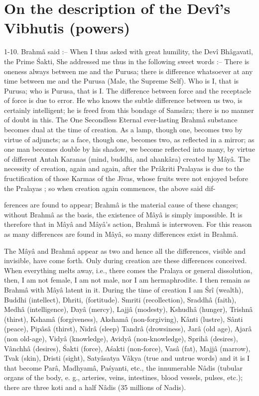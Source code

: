 ﻿\chapter{On the description of the Dev\^i's Vibhutis (powers)}

1-10. Brahm\^a said :-- When I thus asked with great humility, the Dev\^i Bh\^agavat\^i, the Prime \'Sakti, She addressed me thus in the following sweet words :-- There is oneness always between me and the Purusa; there is difference whatsoever at any time between me and the Purusa (Male, the Supreme Self). Who is I, that is Purusa; who is Purusa, that is I. The difference between force and the receptacle of force is due to error. He who knows the subtle difference between us two, is certainly intelligent; he is freed from this bondage of Sams\^ara; there is no manner of doubt in this. The One Secondless Eternal ever-lasting Brahm\^a substance becomes dual at the time of creation. As a lamp, though one, becomes two by virtue of adjuncts; as a face, though one, becomes two, as reflected in a mirror; as one man becomes double by his shadow, we become reflected into many, by virtue of different Antah Karanas (mind, buddhi, and ahank\^ara) created by M\^ay\^a. The necessity of creation, again and again, after the Pr\^akriti Pralayas is due to the fructification of those Karmas of the J\^ivas, whose fruits were not enjoyed before the Pralayas ; so when creation again commences, the above said dif-

ferences are found to appear; Brahm\^a is the material cause of these changes; without Brahm\^a as the basis, the existence of M\^ay\^a is simply impossible. It is therefore that in M\^ay\^a and M\^ay\^a's action, Brahm\^a is interwoven. For this reason as many differences are found in M\^ay\^a, so many differences exist in Brahm\^a.

The M\^ay\^a and Brahm\^a appear as two and hence all the differences, visible and invisible, have come forth. Only during creation are these differences conceived. When everything melts away, i.e., there comes the Pralaya or general dissolution, then, I am not female, I am not male, nor I am hermaphrodite. I then remain as Brahm\^a with M\^ay\^a latent in it. During the time of creation I am \'Sr\^i (wealth), Buddhi (intellect), Dhriti, (fortitude). Smriti (recollection), Sraddh\^a (faith), Medh\^a (intelligence), Day\^a (mercy), Lajj\^a (modesty), Kshudh\^a (hunger), Trishn\^a (thirst), Ksham\^a (forgiveness), Aksham\^a (non-forgiving), K\^anti (lustre), S\^anti (peace), Pip\^as\^a (thirst), Nidr\^a (sleep) Tandr\^a (drowsiness), Jar\^a (old age), Ajar\^a (non old-age), Vidy\^a (knowledge), Avidy\^a (non-knowledge), Sprih\^a (desires), V\^anchh\^a (desires), \'Sakti (force), A\'sakti (non-force), Vas\^a (fat), Majj\^a (marrow), Tvak (skin), Dristi (sight), Saty\^asatya V\^akya (true and untrue words) and it is I that become Par\^a, Madhyam\^a, Pa\'syanti, etc., the innumerable N\^adis (tubular organs of the body, e. g., arteries, veins, intestines, blood vessels, pulses, etc.); there are three koti and a half N\^adis (35 millions of Nadis).

